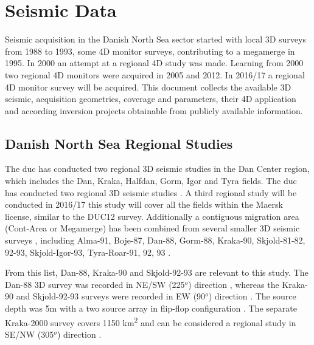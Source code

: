 \chapter{Seismic Data}

Seismic acquisition in the Danish North Sea sector started with local 3D surveys from 1988 to 1993, some 4D monitor surveys, contributing to a megamerge in 1995. In 2000 an attempt at a regional 4D study was made. Learning from 2000 two regional 4D monitors were acquired in 2005 and 2012. In 2016/17 a regional 4D monitor survey will be acquired. This document collects the available 3D seismic, acquisition geometries, coverage and parameters, their 4D application and according inversion projects obtainable from publicly available information.

\section{Danish North Sea Regional Studies}

The \acf{duc} has conducted two regional 3D seismic studies in the Dan Center region, which includes 
the Dan, Kraka, Halfdan, Gorm, Igor and Tyra fields. The \ac{duc} has conducted two regional 3D seismic studies \citep{Micksch2014}. A third regional study will be conducted in 2016/17 \citep{Micksch2014,RambollDan2015} this study will cover all the fields within the Maersk license, similar to the DUC12 survey. Additionally a contiguous migration area (Cont-Area or Megamerge) has been combined from several smaller 3D seismic surveys \citep{Thomasen1994,Jakobsen2010,Klinkby2005}, including Alma-91, Boje-87, Dan-88, Gorm-88, Kraka-90, Skjold-81-82, 92-93, Skjold-Igor-93, Tyra-Roar-91, 92, 93 \citep{GEUSdata}.

From this list, Dan-88, Kraka-90 and Skjold-92-93 are relevant to this study. The Dan-88 3D survey was recorded in NE/SW (225$^o$) direction \citep{Zaske2014}, whereas the Kraka-90 and Skjold-92-93 surveys were recorded in EW (90$^o$) direction \citep{Calvert2014, Zaske2014}. The source depth was 5m with a two source array in flip-flop configuration \citep{Calvert2014}. The separate Kraka-2000 survey covers 1150 km\textsuperscript{2} \citep{Jakobsen2010} and can be considered a regional study in SE/NW (305$^o$) direction  \citep{GEUSdata}.

